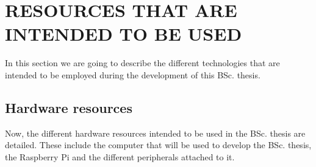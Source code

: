 \documentclass{pre-tfg}
\begin{document}
\section{RESOURCES THAT ARE INTENDED TO BE USED}

In this section we are going to describe the different technologies that are intended to be employed during the development of this BSc. thesis.

\subsection{Hardware resources}
Now, the different hardware resources intended to be used in the BSc. thesis are detailed. These include the computer that will be used to develop the BSc. thesis, the Raspberry Pi and the different peripherals attached to it. \vspace{-2mm}
\end{document}
